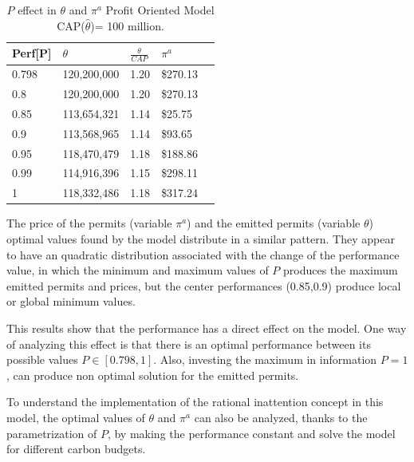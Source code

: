 \documentclass[a4paper,fleqn]{cas-dc}
\begin{document}
\begin{table}[H]
    \caption{{\footnotesize $P$ effect in $\theta$ and $\pi^a$ Profit Oriented Model  CAP($\hat{\theta}$)= 100 million.}}
    \label{efectopenthetapia}
    \centering
    \begin{tabular}{ l l l l l }
    \hline
        Perf[P]  & $\theta$  & $\frac{\theta}{CAP}$  & $\pi^a$  \\ \hline
        0.798   & 120,200,000 & 1.20  &  \$270.13   \\ \hline
        0.8  & 120,200,000 & 1.20  &  \$270.13   \\ \hline
        0.85  & 113,654,321 & 1.14  &  \$25.75   \\ \hline
        0.9 & 113,568,965 & 1.14  &  \$93.65   \\ \hline
        0.95  & 118,470,479 & 1.18  &  \$188.86   \\ \hline
        0.99 & 114,916,396 & 1.15  &  \$298.11   \\ \hline
        1  & 118,332,486 & 1.18  &  \$317.24   \\ \hline
    \end{tabular}
\end{table}

The price of the permits (variable $\pi^a$) and the emitted permits (variable $\theta$) optimal values found by the model distribute in a similar pattern. They appear to have an quadratic distribution associated with the change of the performance value, in which the minimum and maximum values of $P$ produces the maximum emitted permits and prices, but the center performances (0.85,0.9) produce local or global minimum values.

This results show that the performance has a direct effect on the model. One way of analyzing this effect is that there is an optimal performance between its possible values $P \in [0.798,1]$. Also, investing the maximum in information $P=1$, can produce non optimal solution for the emitted permits. 

To understand the implementation of the rational inattention concept in this model, the optimal values of $\theta$ and $\pi^a$ can also be analyzed, thanks to the parametrization of $P$, by making the performance constant and solve the model for different carbon budgets. 
\end{document}
